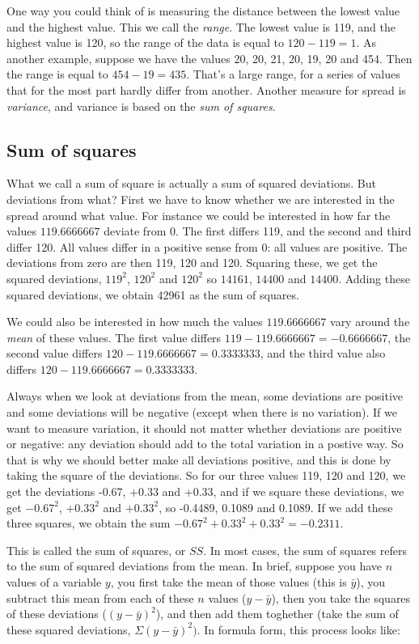\documentclass[]{report}\usepackage[]{graphicx}\usepackage[]{color}
\begin{document}
One way you could think of is measuring the distance between the lowest value and the highest value. This we call the \textit{range}. The lowest value is 119, and the highest value is 120, so the range of the data is equal to $120-119=1$. As another example, suppose we have the values 20, 20, 21, 20, 19, 20 and 454. Then the range is equal to $454-19=435$. That's a large range, for a series of values that for the most part hardly differ from another. Another measure for spread is \textit{variance}, and variance is based on the \textit{sum of squares}. 

\subsection{Sum of squares}

What we call a sum of square is actually a sum of squared deviations. But deviations from what? First we have to know whether we are interested in the spread around what value. For instance we could be interested in how far the values $119.6666667$ deviate from 0. The first differs 119, and the second and third differ 120. All values differ in a positive sense from 0: all values are positive. The deviations from zero are then 119, 120 and 120. Squaring these, we get the squared deviations, $119^2$, $120^2$ and $120^2$ so $14161$, $ 14400$ and $ 14400$. Adding these squared deviations, we obtain 42961 as the sum of squares. 

We could also be interested in how much the values $119.6666667$ vary around the \textit{mean} of these values. The first value differs $119-119.6666667= -0.6666667$, the second value differs $120-119.6666667= 0.3333333$, and the third value also differs $120-119.6666667= 0.3333333$.

Always when we look at deviations from the mean, some deviations are positive and some deviations will be negative (except when there is no variation). If we want to measure variation, it should not matter whether deviations are positive or negative: any deviation should add to the total variation in a postive way. So that is why we should better make all deviations positive, and this is done by taking the square of the deviations. So for our three values 119, 120 and 120, we get the deviations -0.67, +0.33 and +0.33, and if we square these deviations, we get $-0.67^2$, $+0.33^2$ and $+0.33^2$, so -0.4489, 0.1089 and 0.1089. If we add these three squares, we obtain the sum $-0.67^2+0.33^2+0.33^2=-0.2311$.   

This is called the sum of squares, or $SS$. In most cases, the sum of squares refers to the sum of squared deviations from the mean. In brief, suppose you have $n$ values of a variable $y$, you first take the mean of those values (this is $\bar{y}$), you subtract this mean from each of these $n$ values ($y-\bar{y}$), then you take the squares of these deviations ($(y-\bar{y})^2$), and then add them toghether (take the sum of these squared deviations, $\Sigma (y-\bar{y})^2)$. In formula form, this process looks like:
\end{document}
